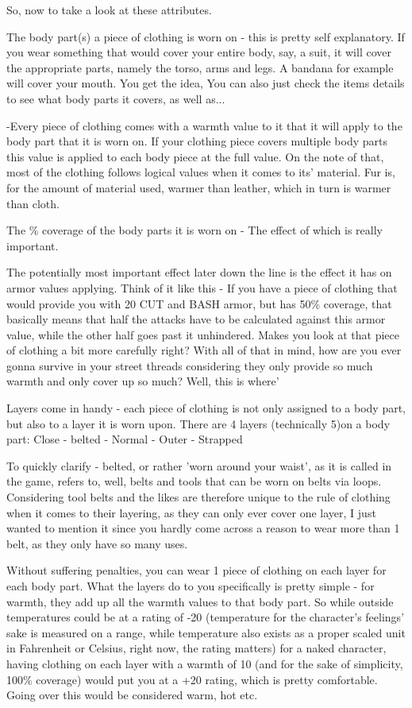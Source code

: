 So, now to take a look at these attributes.

The body part(s) a piece of clothing is worn on - this is pretty self explanatory. If you wear something that would cover your entire body, say, a suit, it will cover the appropriate parts, namely the torso, arms and legs. A bandana for example will cover your mouth. You get the idea, You can also just check the items details to see what body parts it covers, as well as...

-Every piece of clothing comes with a warmth value to it that it will apply to the body part that it is worn on. If your clothing piece covers multiple body parts this value is applied to each body piece at the full value. On the note of that, most of the clothing follows logical values when it comes to its' material. Fur is, for the amount of material used, warmer than leather, which in turn is warmer than cloth.

The \% coverage of the body parts it is worn on - The effect of which is really important.

The potentially most important effect later down the line is the effect it has on armor values applying. Think of it like this - If you have a piece of clothing that would provide you with 20 CUT and BASH armor, but has 50\% coverage, that basically means that half the attacks have to be calculated against this armor value, while the other half goes past it unhindered. Makes you look at that piece of clothing a bit more carefully right? With all of that in mind, how are you ever gonna survive in your street threads considering they only provide so much warmth and only cover up so much? Well, this is where'

Layers come in handy - each piece of clothing is not only assigned to a body part, but also to a layer it is worn upon.
There are 4 layers (technically 5)on a body part: Close - belted - Normal - Outer - Strapped

To quickly clarify - belted, or rather 'worn around your waist', as it is called in the game, refers to, well, belts and tools that can be worn on belts via loops. Considering tool belts and the likes are therefore unique to the rule of clothing when it comes to their layering, as they can only ever cover one layer, I just wanted to mention it since you hardly come across a reason to wear more than 1 belt, as they only have so many uses.

Without suffering penalties, you can wear 1 piece of clothing on each layer for each body part. What the layers do to you specifically is pretty simple - for warmth, they add up all the warmth values to that body part. So while outside temperatures could be at a rating of -20 (temperature for the character's feelings' sake is measured on a range, while temperature also exists as a proper scaled unit in Fahrenheit or Celsius, right now, the rating matters) for a naked character, having clothing on each layer with a warmth of 10 (and for the sake of simplicity, 100\% coverage) would put you at a +20 rating, which is pretty comfortable. Going over this would be considered warm, hot etc.

